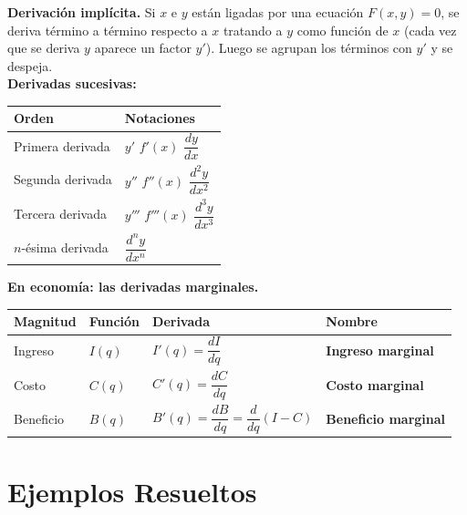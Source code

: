 \documentclass[12pt, letterpaper]{article}
\begin{document}
\begin{cuadroteoria}
  \textbf{Derivación implícita.} Si $x$ e $y$ están ligadas por una ecuación $F(x,y)=0$, se deriva término a término respecto a $x$ tratando a $y$ como función de $x$ (cada vez que se deriva $y$ aparece un factor $y'$). Luego se agrupan los términos con $y'$ y se despeja.
  \\[6pt]
  \textbf{Derivadas sucesivas:}
  \begin{center}
  \begin{tabular}{@{}ll@{}}
    \toprule
    \textbf{Orden} & \textbf{Notaciones} \\
    \midrule
    Primera derivada  & $y'$ \quad $f'(x)$ \quad $\dfrac{dy}{dx}$ \\
    Segunda derivada  & $y''$ \quad $f''(x)$ \quad $\dfrac{d^{2}y}{dx^{2}}$ \\
    Tercera derivada  & $y'''$ \quad $f'''(x)$ \quad $\dfrac{d^{3}y}{dx^{3}}$ \\
    $n$-ésima derivada & $\dfrac{d^{n}y}{dx^{n}}$ \\
    \bottomrule
  \end{tabular}
  \end{center}
\end{cuadroteoria}

\begin{cuadroextra}
  \textbf{En economía: las derivadas marginales.}
  \begin{center}
  \begin{tabular}{@{}llll@{}}
    \toprule
    \textbf{Magnitud} & \textbf{Función} & \textbf{Derivada} & \textbf{Nombre} \\
    \midrule
    Ingreso  & $I(q)$ & $I'(q) = \dfrac{dI}{dq}$ & \textbf{Ingreso marginal} \\
    Costo    & $C(q)$ & $C'(q) = \dfrac{dC}{dq}$ & \textbf{Costo marginal} \\
    Beneficio & $B(q)$ & $B'(q) = \dfrac{dB}{dq} = \dfrac{d}{dq}(I - C)$ & \textbf{Beneficio marginal} \\
    \bottomrule
  \end{tabular}
  \end{center}
\end{cuadroextra}

\newpage
\section{Ejemplos Resueltos}
\end{document}
